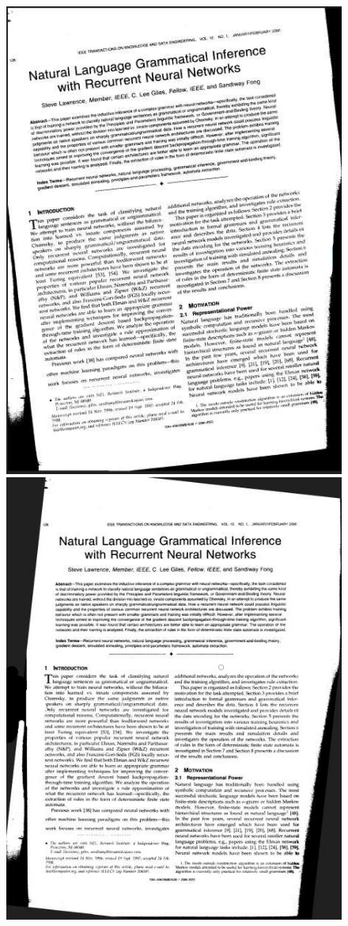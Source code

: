 \begin{figure}[t]
\centering
\includegraphics[height=0.25\textheight]{img/preprocessing/deskew_orig.jpg}
\qquad
\includegraphics[height=0.25\textheight]{img/preprocessing/deskew_new.jpg}

\end{figure}
